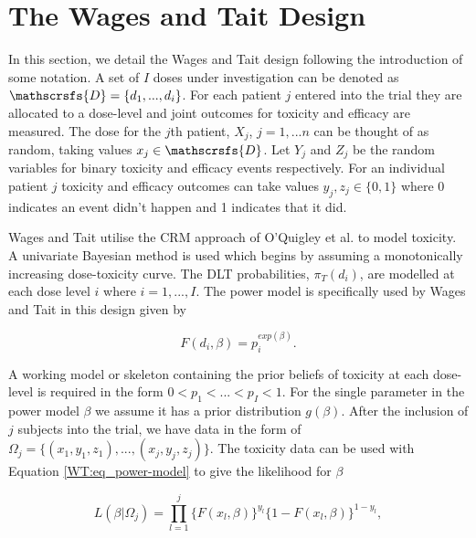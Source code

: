 \section{The Wages and Tait Design}
\label{WT:Wages-and-Tait-Design}

In this section, we detail the Wages and Tait design following the introduction of some notation. A set of $I$ doses under investigation can be denoted as $\mathscrsfs{D} = \{d_1, ...,d_i\}$. For each patient $j$ entered into the trial they are allocated to a dose-level and joint outcomes for toxicity and efficacy are measured. The dose for the $j$th patient, $X_j$, $j = 1,...n$ can be thought of as random, taking values $x_j \in  \mathscrsfs{D}$. Let $Y_j$ and $Z_j$ be the random variables for binary toxicity and efficacy events respectively. For an individual patient $j$ toxicity and efficacy outcomes can take values $y_j, z_j \in \{0,1\}$ where 0 indicates an event didn't happen and 1 indicates that it did. 

Wages and Tait \cite{wagesSeamlessPhaseII2015} utilise the CRM approach of O'Quigley et al. \cite{oquigleyContinualReassessmentMethod1990} to model toxicity. A univariate Bayesian method is used which begins by assuming a monotonically increasing dose-toxicity curve. The DLT probabilities, $\pi_T(d_i)$, are modelled at each dose level $i$ where $i= 1, ..., I$. The power model is specifically used by Wages and Tait in this design given by 

\begin{equation}
\label{WT:eq_power-model}
F(d_i, \beta) = p_i^{exp(\beta)}.
\end{equation}

A working model or skeleton containing the prior beliefs of toxicity at each dose-level is required in the form $0 < p_1 < ... <p_I <1$. For the single parameter in the power model $\beta$ we assume it has a prior distribution $g(\beta)$. After the inclusion of $j$ subjects into the trial, we have  data in the form of $\Omega_j = \{(x_1,y_1,z_1), ..., (x_j,y_j,z_j)\}$. The toxicity data can be used with Equation \ref{WT:eq_power-model} to give the likelihood for $\beta$

\begin{equation}
L(\beta|\Omega_j)=\prod_{l=1}^{j}\{F(x_l,\beta)\}^{y_l}\{1-F(x_l,\beta)\}^{1-y_l},  
\end{equation}

